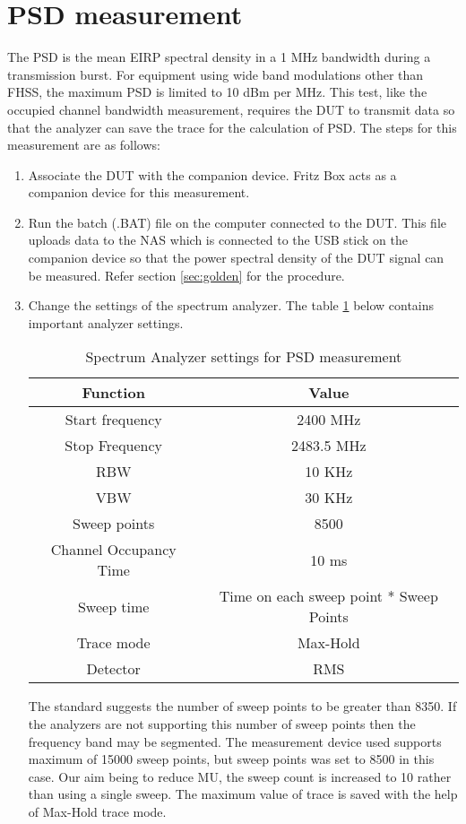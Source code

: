 \section{\acl{PSD} measurement}
\label{sec:psdmeas}
The \acl{PSD} is the mean \acf{EIRP} spectral density in a 1 MHz bandwidth during a transmission burst. For equipment using wide band modulations other than \acs{FHSS}, the maximum \acf{PSD} is limited to 10 dBm per MHz. This test, like the occupied channel bandwidth measurement, requires the \acs{DUT} to transmit data so that the analyzer can save the trace for the calculation of \acf{PSD}. The steps for this measurement are as follows:

\begin{enumerate}
  \item Associate the DUT with the companion device. Fritz Box acts as a companion device for this measurement. 
\item Run the batch (.BAT) file on the computer connected to the \acs{DUT}. This file uploads data to the \ac{NAS} which is connected to the USB stick on the companion device so that the power spectral density of the \acs{DUT} signal can be measured. Refer section \ref{sec:golden} for the procedure.
\item Change the settings of the spectrum analyzer. The table \ref{tab:analyzerpsd} below contains important analyzer settings.
\begin{table}[ht]
\begin{center}
\begin {tabular} {|c|c|} 
\toprule
Function & Value \\ 
\midrule 
Start frequency & 2400 MHz \\
Stop Frequency  & 2483.5 MHz\\
\ac{RBW} & 10 KHz \\
\ac{VBW} & 30 KHz\\
Sweep points & 8500 \\
Channel Occupancy Time & 10 ms \\
Sweep time & Time on each sweep point * Sweep Points \\
Trace mode & \acs{Max-Hold} \\
Detector & \ac{RMS}\\
\bottomrule
\end{tabular} 
\caption{Spectrum Analyzer settings for \ac{PSD} measurement}
\label{tab:analyzerpsd}
\end{center}
\end{table}
The standard suggests the number of sweep points to be greater than 8350. If the analyzers are not supporting this number of sweep points then the frequency band may be segmented. The measurement device used supports maximum of 15000 sweep points, but sweep points was set to 8500 in this case. Our aim being to reduce \acl{MU}, the sweep count is increased to 10 rather than using a single sweep. The maximum value of trace is saved with the help of \acs{Max-Hold} trace mode.
  

\end{enumerate}
